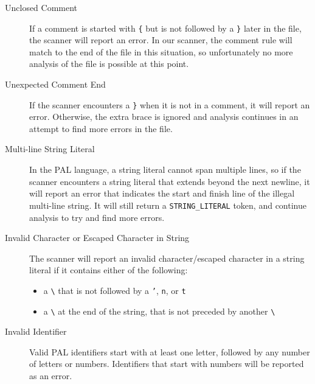 \documentclass{article}
\begin{document}
\begin{description}
  \item[Unclosed Comment]
	  If a comment is started with \texttt{\{} but is not followed by a
	  \texttt{\}} later in the file, the scanner will report an error.  In
	  our scanner, the comment rule will match to the end of the file in
	  this situation, so unfortunately no more analysis of the file is
	  possible at this point.

  \item[Unexpected Comment End]
	  If the scanner encounters a \texttt{\}} when it is not in a comment,
	  it will report an error. Otherwise, the extra brace is ignored and analysis 
	  continues in an attempt to find more errors in the file.

  \item[Multi-line String Literal]
	  In the PAL language, a string literal cannot span multiple lines, so 
	  if the scanner encounters a string literal that extends beyond the next
	  newline, it will report an error that indicates the start and finish line
	  of the illegal multi-line string. It will still return a \texttt{STRING\_LITERAL}
	  token, and continue analysis to try and find more errors.

  \item[Invalid Character or Escaped Character in String]
	  The scanner will report an invalid character/escaped character in a string
	  literal if it contains either of the following:
	  \begin{itemize}
		  \item a \texttt{\textbackslash} that is not followed by a 
			  \texttt{'}, \texttt{n}, or \texttt{t}
		  \item a \texttt{\textbackslash} at the end of the string, that
			  is not preceded by another \texttt{\textbackslash}
	  \end{itemize}



  \item[Invalid Identifier]
	  Valid PAL identifiers start with at least one letter, followed by any number
	  of letters or numbers. Identifiers that start with numbers will be reported
	  as an error. 

\end{description}
\end{document}
